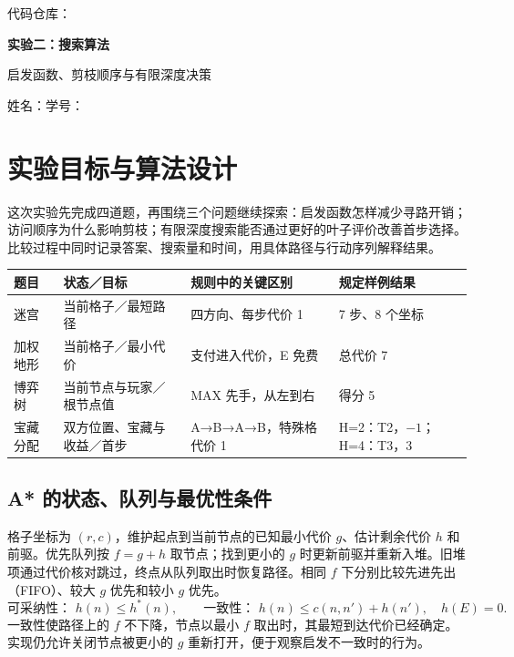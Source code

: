 \documentclass[UTF8,a4paper,10pt,fontset=fandol]{ctexart}
\begin{document}
\pagestyle{plain}
\noindent 代码仓库：\ifdefempty{\RepoURL}{待填写实验二仓库地址}{\expandafter\url\expandafter{\RepoURL}}
\begin{center}
{\LARGE\bfseries 实验二：搜索算法}\par\vspace{4pt}
启发函数、剪枝顺序与有限深度决策\par
\vspace{3pt}姓名：\StudentName\qquad 学号：\StudentID
\end{center}

\section{实验目标与算法设计}
这次实验先完成四道题，再围绕三个问题继续探索：启发函数怎样减少寻路开销；访问顺序为什么影响剪枝；有限深度搜索能否通过更好的叶子评价改善首步选择。比较过程中同时记录答案、搜索量和时间，用具体路径与行动序列解释结果。

\begin{center}\small
\begin{tabular}{llll}
\toprule 题目 & 状态／目标 & 规则中的关键区别 & 规定样例结果\\\midrule
迷宫 & 当前格子／最短路径 & 四方向、每步代价 1 & 7 步、8 个坐标\\
加权地形 & 当前格子／最小代价 & 支付进入代价，E 免费 & 总代价 7\\
博弈树 & 当前节点与玩家／根节点值 & MAX 先手，从左到右 & 得分 5\\
宝藏分配 & 双方位置、宝藏与收益／首步 & A→B→A→B，特殊格代价 1 & H=2：T2，$-1$；H=4：T3，3\\
\bottomrule
\end{tabular}\end{center}

\subsection{A* 的状态、队列与最优性条件}
格子坐标为 $(r,c)$，维护起点到当前节点的已知最小代价 $g$、估计剩余代价 $h$ 和前驱。优先队列按 $f=g+h$ 取节点；找到更小的 $g$ 时更新前驱并重新入堆。旧堆项通过代价核对跳过，终点从队列取出时恢复路径。相同 $f$ 下分别比较先进先出（FIFO）、较大 $g$ 优先和较小 $g$ 优先。
\[
\text{可采纳性： }h(n)\le h^*(n),\qquad
\text{一致性： }h(n)\le c(n,n')+h(n'),\quad h(E)=0.
\]
一致性使路径上的 $f$ 不下降，节点以最小 $f$ 取出时，其最短到达代价已经确定。实现仍允许关闭节点被更小的 $g$ 重新打开，便于观察启发不一致时的行为。
\end{document}

